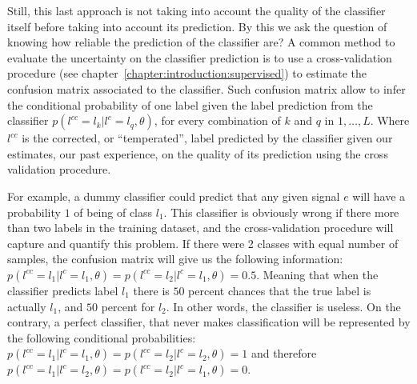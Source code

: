 Still, this last approach is not taking into account the quality of the classifier itself before taking into account its prediction. By this we ask the question of knowing how reliable the prediction of the classifier are? A common method to evaluate the uncertainty on the classifier prediction is to use a cross-validation procedure (see chapter~\ref{chapter:introduction:supervised}) to estimate the confusion matrix associated to the classifier. Such confusion matrix allow to infer the conditional probability of one label given the label prediction from the classifier $p(l^{cc} = l_k| l^c = l_q, \theta)$, for every combination of $k$ and $q$ in $1, \ldots, L$. Where $l^{cc}$ is the corrected, or ``temperated'', label predicted by the classifier given our estimates, our past experience, on the quality of its prediction using the cross validation procedure.

For example, a dummy classifier could predict that any given signal $e$ will have a probability $1$ of being of class $l_1$. This classifier is obviously wrong if there more than two labels in the training dataset, and the cross-validation procedure will capture and quantify this problem. If there were 2 classes with equal number of samples, the confusion matrix will give us the following information: $p(l^{cc} = l_1| l^c = l_1, \theta) = p(l^{cc} = l_2| l^c = l_1, \theta) = 0.5$. Meaning that when the classifier predicts label $l_1$ there is $50$ percent chances that the true label is actually $l_1$, and $50$ percent for $l_2$. In other words, the classifier is useless. On the contrary, a perfect classifier, that never makes classification will be represented by the following conditional probabilities: $p(l^{cc} = l_1| l^c = l_1, \theta) = p(l^{cc} = l_2| l^c = l_2, \theta) = 1$ and therefore $p(l^{cc} = l_1| l^c = l_2, \theta) = p(l^{cc} = l_2| l^c = l_1, \theta) = 0$.

